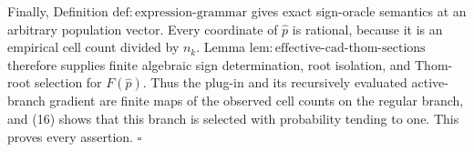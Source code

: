 Finally, Definition \(\mathrm{def:expression\text{-}grammar}\) gives exact sign-oracle semantics at an arbitrary population vector.  Every coordinate of \(\widehat p\) is rational, because it is an empirical cell count divided by \(n_k\).  Lemma \(\mathrm{lem:effective\text{-}cad\text{-}thom\text{-}sections}\) therefore supplies finite algebraic sign determination, root isolation, and Thom-root selection for \(F(\widehat p)\).  Thus the plug-in and its recursively evaluated active-branch gradient are finite maps of the observed cell counts on the regular branch, and (16) shows that this branch is selected with probability tending to one.  This proves every assertion. \(\square\)